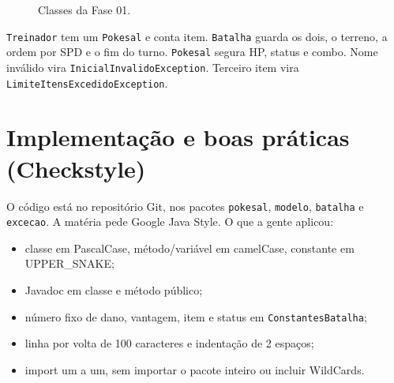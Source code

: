 \documentclass[12pt,oneside,a4paper,article]{abntex2}
\begin{document}
\begin{figure}[H]
{%
}
\caption{Classes da Fase 01.}
\label{fig:classes}
\end{figure}

\texttt{Treinador} tem um \texttt{Pokesal} e conta item.
\texttt{Batalha} guarda os dois, o terreno, a ordem por SPD e o fim do turno.
\texttt{Pokesal} segura HP, status e combo. Nome inválido vira
\texttt{InicialInvalidoException}. Terceiro item vira
\texttt{LimiteItensExcedidoException}.

\section{Implementação e boas práticas (Checkstyle)}
\label{sec:checkstyle}

O código está no repositório Git, nos pacotes \texttt{pokesal}, \texttt{modelo},
\texttt{batalha} e \texttt{excecao}. A matéria pede Google Java Style. O que
a gente aplicou:

\begin{itemize}
  \item classe em PascalCase, método/variável em camelCase, constante em
        UPPER\_SNAKE;
  \item Javadoc em classe e método público;
  \item número fixo de dano, vantagem, item e status em
        \texttt{ConstantesBatalha};
  \item linha por volta de 100 caracteres e indentação de 2 espaços;
  \item import um a um, sem importar o pacote inteiro ou incluir WildCards.
\end{itemize}
\end{document}
